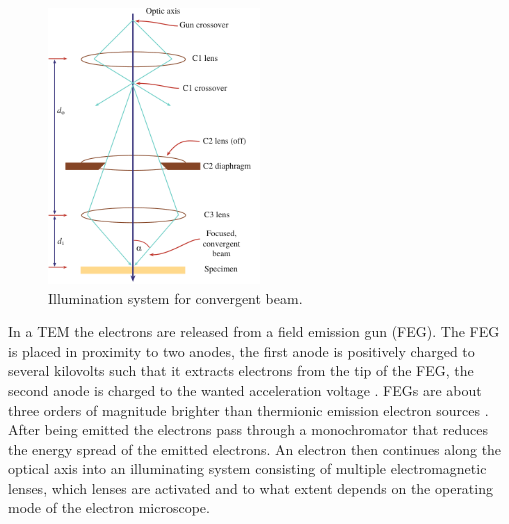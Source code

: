 \begin{figure}
    \centering
    \includegraphics[width=0.5\textwidth, keepaspectratio]{resources/Figures/stem_operating.png}
    \caption{Illumination system for convergent beam.}
    \label{fig:stem_operating}
\end{figure}

In a TEM the electrons are released from a field emission gun (FEG). 
The FEG is placed in proximity to two anodes, the first anode is positively charged to several kilovolts such that it extracts electrons from the tip of the FEG, the second anode is charged to the wanted acceleration voltage \cite{Williams2009-ww}.
FEGs are about three orders of magnitude brighter than thermionic emission electron sources \cite{field-emission}.
After being emitted the electrons pass through a monochromator that reduces the energy spread of the emitted electrons. An electron then continues along the optical axis into an illuminating system consisting of multiple electromagnetic lenses, which lenses are activated and to what extent depends on the operating mode of the electron microscope.

